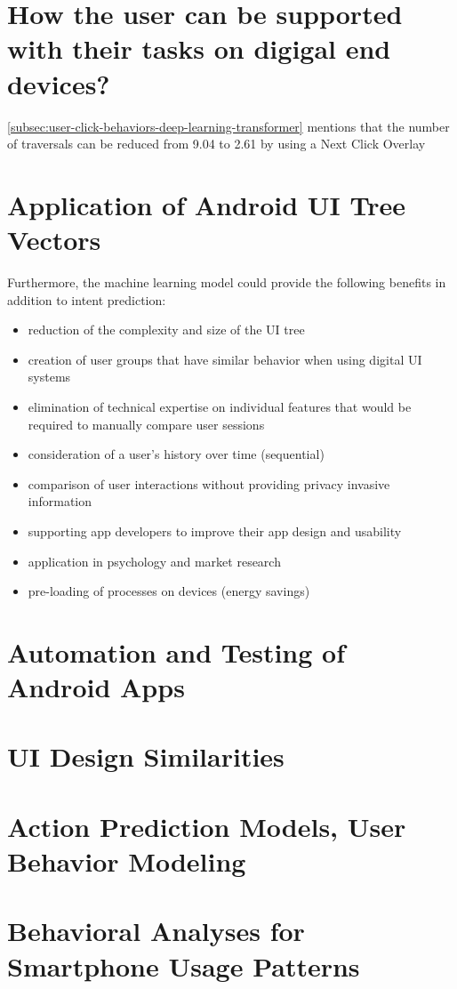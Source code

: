 \section{How the user can be supported with their tasks on digigal end devices?}

\ref{subsec:user-click-behaviors-deep-learning-transformer} mentions that the number of traversals can be reduced from 9.04 to 2.61 by using a Next Click Overlay \cite{zhou2021large}

\section{Application of Android UI Tree Vectors}


Furthermore, the machine learning model could provide the following benefits in addition to intent prediction:
\begin{itemize}
    \item reduction of the complexity and size of the UI tree
    \item creation of user groups that have similar behavior when using digital UI systems \cite{jayarajah2015need}
    \item elimination of technical expertise on individual features that would be required to manually compare user sessions \cite{ghods2019activity2vec}
    \item consideration of a user's history over time (sequential)
    \item comparison of user interactions without providing privacy invasive information
    \item supporting app developers to improve their app design and usability
    \item application in psychology and market research
    \item pre-loading of processes on devices (energy savings) \cite{shen2019deepapp}
\end{itemize}

\section{Automation and Testing of Android Apps}
\section{UI Design Similarities}
\section{Action Prediction Models, User Behavior Modeling}
\section{Behavioral Analyses for Smartphone Usage Patterns}

